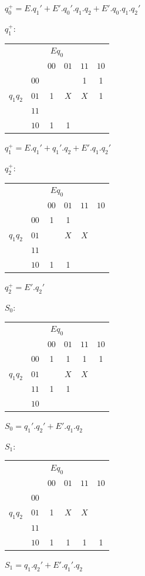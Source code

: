 \documentclass[11pt]{article}
\begin{document}
\begin{multicols}{2}
$q_0^+ = E . q_1' + E'.q_0'.q_1.q_2 + E'.q_0.q_1 . q_2' $

$q_1^+$:
\begin{tabular}{|cc|c|c|c|c|}
\hline
\multicolumn{6}{|c|}{$E q_0$ } \\
           & & \tiny{$00$} & \tiny{$01$}  & \tiny{$11$}  & \tiny{$10$}  \\
           & \tiny{$00$} &   &   & 1 & 1 \\
$q_1 q_2$  & \tiny{$01$} & 1 & $X$ & $X$ & 1 \\
           & \tiny{$11$} &   &   &   &   \\
           & \tiny{$10$} & 1 & 1 &   &   \\
\hline
\end{tabular}

$q_1^+ = E . q_1' + q_1'.q_2 + E'.q_1.q_2' $

$q_2^+$:
\begin{tabular}{|cc|c|c|c|c|}
\hline
\multicolumn{6}{|c|}{$E q_0$ } \\
           & & \tiny{$00$} & \tiny{$01$}  & \tiny{$11$}  & \tiny{$10$}  \\
           & \tiny{$00$} & 1 & 1 &   &   \\
$q_1 q_2$  & \tiny{$01$} &   & $X$ & $X$ &   \\
           & \tiny{$11$} &   &   &   &   \\
           & \tiny{$10$} & 1 & 1 &   &   \\
\hline
\end{tabular}

$q_2^+ = E'. q_2'$

$S_0$: 
\begin{tabular}{|cc|c|c|c|c|}
\hline
\multicolumn{6}{|c|}{$E q_0$ } \\
           & & \tiny{$00$} & \tiny{$01$}  & \tiny{$11$}  & \tiny{$10$}  \\
           & \tiny{$00$} & 1 & 1 & 1 & 1 \\
$q_1 q_2$  & \tiny{$01$} &   & $X$ & $X$ &   \\
           & \tiny{$11$} & 1 & 1 &   &   \\
           & \tiny{$10$} &   &   &   &   \\
\hline
\end{tabular}

$S_0 = q_1'. q_2' + E'.q_1. q_2 $

$S_1$: 
\begin{tabular}{|cc|c|c|c|c|}
\hline
\multicolumn{6}{|c|}{$E q_0$ } \\
           & & \tiny{$00$} & \tiny{$01$}  & \tiny{$11$}  & \tiny{$10$}  \\
           & \tiny{$00$} &   &   &   &   \\
$q_1 q_2$  & \tiny{$01$} & 1 & $X$ & $X$ &   \\
           & \tiny{$11$} &   &   &   &   \\
           & \tiny{$10$} & 1 & 1 & 1 & 1 \\
\hline
\end{tabular}

$S_1 = q_1. q_2' + E'.q_1'. q_2 $


\end{multicols}
\end{document}
